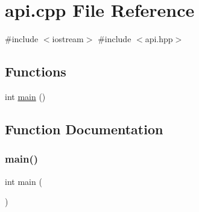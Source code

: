 \hypertarget{a00002}{}\section{api.\+cpp File Reference}
\label{a00002}
{\ttfamily \#include $<$iostream$>$}\newline
{\ttfamily \#include $<$api.\+hpp$>$}\newline
\subsection*{Functions}
\begin{DoxyCompactItemize}
\item 
int \hyperlink{a00002_ae66f6b31b5ad750f1fe042a706a4e3d4}{main} ()
\end{DoxyCompactItemize}


\subsection{Function Documentation}
\mbox{\label{a00002_ae66f6b31b5ad750f1fe042a706a4e3d4}} 
\subsubsection{\texorpdfstring{main()}{main()}}
{\footnotesize\ttfamily int main (\begin{DoxyParamCaption}{ }\end{DoxyParamCaption})}

